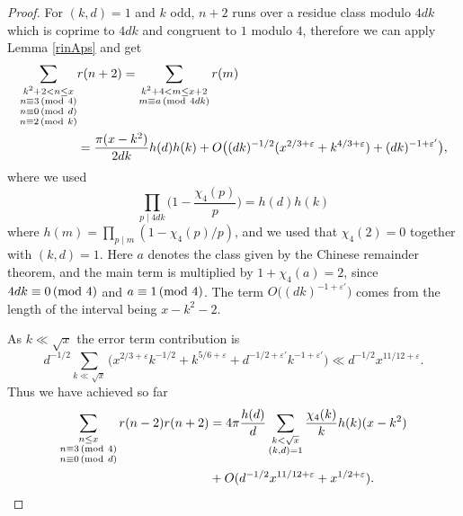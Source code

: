 \documentclass[12pt]{amsart}
\theoremstyle{remark}
\renewcommand{\pmod}[1]{\mkern3mu(\mathrm{mod}\ #1)}
\begin{document}
\begin{proof}
    For $(k,d)=1$ and $k$ odd, $n+2$ runs over a residue class modulo $4dk$ which is coprime to $4dk$ and congruent to $1$ modulo $4$, therefore we can apply Lemma \ref{rinAps} and get    
    \[
        \begin{split}
            \sum_{\substack{k^2+2 < n \le x\\ n \equiv 3 \pmod 4 \\ n \equiv 0 \pmod d \\ n \equiv 2 \pmod k}}& r(n+2) = \sum_{\substack{k^2+4 < m \le x+2 \\ m \equiv a \pmod {4dk}}} r(m) \\
            &= \frac{\pi (x-k^2)}{2 dk} h(d) h(k) + O\bigl((dk)^{-1/2} (x^{2/3+\varepsilon}+k^{4/3 + \varepsilon}) + (dk)^{-1+\varepsilon'}\bigr),
        \end{split}
    \]
    where we used
    \[
        \prod_{p \mid 4dk} \biggl( 1-\frac{\chi_4(p)}{p}\biggr) =  h(d)h(k)
    \]
    where $h(m)=\prod_{p\mid m}(1-\chi_4(p)/p)$, and we used that $\chi_4(2)=0$ together with
    $(k,d)=1$. Here $a$ denotes the class given by the Chinese remainder theorem, and the main
    term is multiplied by $1 + \chi_4(a) = 2$, since $4dk \equiv 0 \pmod 4$ and $a \equiv 1 \pmod 4$.
    The term $O\bigl((dk)^{-1+\varepsilon'}\bigr)$ comes from the length of the interval being $x-k^2-2$.

    As $k \ll \sqrt{x}$ the error term contribution is
    \[
        d^{-1/2}\sum_{k \ll \sqrt{x}} \bigl( x^{2/3+\varepsilon} k^{-1/2} + k^{5/6 +\varepsilon} + d^{-1/2+\varepsilon'}k^{-1+\varepsilon'} \bigr) \ll d^{-1/2} x^{11/12+\varepsilon}.
    \]
    Thus we have achieved so far
    \[
        \begin{split}
            \sum_{\substack{ n \le x\\ n \equiv 3 \pmod 4\\ n \equiv 0 \pmod d}} r(n-2)r(n+2) &= 4 \pi \frac{h(d)}{d} \sum_{\substack{k < \sqrt{x}\\ (k,d)=1}} \frac{\chi_4(k)}{k} h(k) (x-k^2) \\
            &+ O(d^{-1/2} x^{11/12+\varepsilon} + x^{1/2+\varepsilon}).
        \end{split}
    \]
    

\end{proof}
\end{document}
